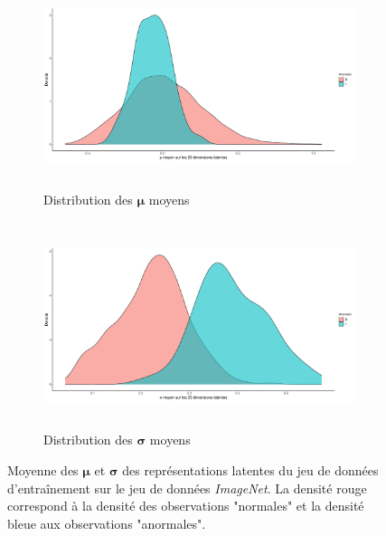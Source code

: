 \begin{figure}[H]
	\centering
	\begin{subfigure}{12cm}
		\centering\includegraphics[width=12cm, height=6cm]{images/latent_stats/plot_mu}
		\caption{Distribution des $\boldsymbol{\mu}$ moyens}
	\end{subfigure}
	\begin{subfigure}{12cm}
		\centering\includegraphics[width=12cm, height=6cm]{images/latent_stats/plot_sigma}
		\caption{Distribution des $\boldsymbol{\sigma}$ moyens}
	\end{subfigure}
	\caption[Moyenne des $\boldsymbol{\mu}$ et $\boldsymbol{\sigma}$ des représentations latentes du jeu de données d'entraînement sur le jeu de données \textit{ImageNet}.]{Moyenne des $\boldsymbol{\mu}$ et $\boldsymbol{\sigma}$ des représentations latentes du jeu de données d'entraînement sur le jeu de données \textit{ImageNet}. La densité rouge correspond à la densité des observations "normales" et la densité bleue aux observations "anormales".}
	\label{fig:cars_latent_stats}
\end{figure}

